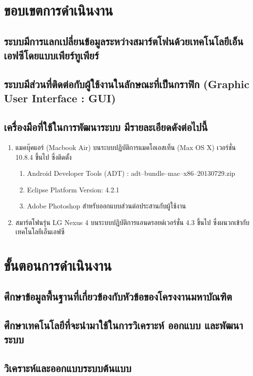 \documentclass[a4paper]{article}
\begin{document}
\section{ขอบเขตการดำเนินงาน}
\subsection{ระบบมีการแลกเปลี่ยนข้อมูลระหว่างสมาร์ตโฟนด้วยเทคโนโลยีเอ็นเอฟซีโดยแบบเพียร์ทูเพียร์}
\subsection{ระบบมีส่วนที่ติดต่อกับผู้ใช้งานในลักษณะที่เป็นกราฟิก (Graphic User Interface : GUI)}
\subsection{เครื่องมือที่ใช้ในการพัฒนาระบบ มีรายละเอียดดังต่อไปนี้}
\begin{enumerate}
	\item แมคบุ๊คแอร์ (Macbook Air) บนระบบปฏิบัติการแมคโอเอสเท็น (Max OS X) เวอร์ชั่น 10.8.4 ขึ้นไป ซึ่งติดตั้ง
	\begin{enumerate}
		\item Android Developer Tools (ADT) : adt--bundle--mac--x86--20130729.zip
		\item Eclipse Platform Version: 4.2.1
		\item Adobe Photoshop สำหรับออกแบบส่วนต่อประสานกับผู้ใช้งาน
	\end{enumerate}
  	\item สมาร์ตโฟนรุ่น LG Nexus 4 บนระบบปฏิบัติการแอนดรอยด์เวอร์ชั่น 4.3 ขึ้นไป ซึ่งผนวกเข้ากับเทคโนโลยีเอ็นเอฟซี
\end{enumerate}

\section{ขั้นตอนการดำเนินงาน}
\subsection{ศึกษาข้อมูลพื้นฐานที่เกี่ยวข้องกับหัวข้อของโครงงานมหาบัณฑิต}
\subsection{ศึกษาเทคโนโลยีที่จะนํามาใช้ในการวิเคราะห์ ออกแบบ และพัฒนาระบบ}
\subsection{วิเคราะห์และออกแบบระบบต้นแบบ}
\end{document}
